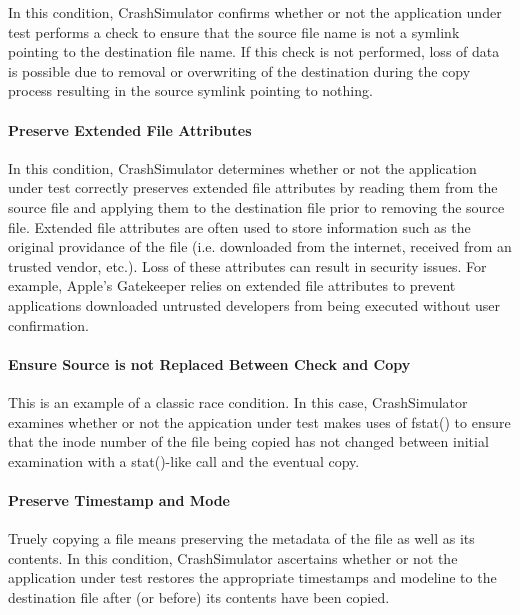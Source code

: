         In this condition, CrashSimulator confirms whether or not the application under test performs a check to ensure
        that the source file name is not a symlink pointing to the destination file name.  If this check is not
        performed, loss of data is possible due to removal or overwriting of the destination during the copy process
        resulting in the source symlink pointing to nothing.

        \paragraph{Preserve Extended File Attributes}

        In this condition, CrashSimulator determines whether or not the application under test correctly preserves
        extended file attributes by reading them from the source file and applying them to the destination file prior to
        removing the source file.  Extended file attributes are often used to store information such as the original
        providance of the file (i.e. downloaded from the internet, received from an trusted vendor, etc.).  Loss of
        these attributes can result in security issues. For example, Apple's Gatekeeper relies on extended file
        attributes to prevent applications downloaded untrusted developers from being executed without user
        confirmation.

        \paragraph{Ensure Source is not Replaced Between Check and Copy}

        This is an example of a classic race condition.  In this case, CrashSimulator examines whether or not the
        appication under test makes uses of fstat() to ensure that the inode number of the file being copied has not
        changed between initial examination with a stat()-like call and the eventual copy.  

        \paragraph{Preserve Timestamp and Mode}

        Truely copying a file means preserving the metadata of the file as well as its contents.  In this condition,
        CrashSimulator ascertains whether or not the application under test restores the appropriate timestamps and
        modeline to the destination file after (or before) its contents have been copied. 

